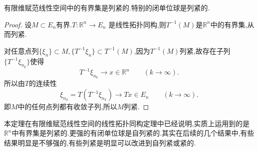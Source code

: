 \documentclass[lang=cn,18pt]{elegantbook}
\begin{document}
\begin{theorem}
    有限维赋范线性空间中的有界集是列紧的.特别的闭单位球是列紧的.
\end{theorem}
\begin{proof}
    设$M \subset E_n$有界.$T:\mathbb{R}^n \to E_n$ 是线性拓扑同构,则$T^{-1}(M)$是$\mathbb{R}^n$中的有界集,从而列紧.
    
    对任意点列$\{ \xi_n \}\subset M,\{ T^{-1}\xi_n \} \subset T^{-1}(M)$,因为$T^{-1}(M)$列紧,故存在子列$\{T^{-1}\xi_{n_k} \}$使得
    $$T^{-1}\xi_{n_k} \to x \in \mathbb{R}^n \quad\quad (k \to \infty ).$$
    所以由$T$的连续性
    $$\xi_{n_k}=T(T^{-1}\xi_{n_k}) \to Tx \in E_n \quad\quad (k \to \infty).$$
    即$M$中的任何点列都有收敛子列,所以$M$列紧.   
\end{proof}
\begin{note}
    本定理在有限维赋范线性空间的线性拓扑同构定理中已经说明,实质上运用到的是$\mathbb{R}^n$中有界集是列紧的.更强的有闭单位球是自列紧的.其实在后续的几个结果中,有些结果明显是不够强的,有些列紧是明显可以改进到自列紧或紧的.
\end{note}
\end{document}
